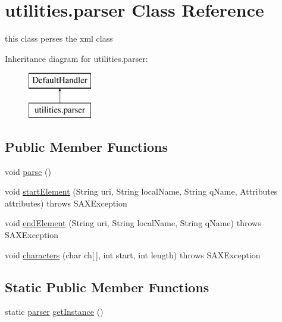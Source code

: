 \hypertarget{classutilities_1_1parser}{}\section{utilities.\+parser Class Reference}
\label{classutilities_1_1parser}


this class perses the xml class  


Inheritance diagram for utilities.\+parser\+:\begin{figure}[H]
\begin{center}
\leavevmode
\includegraphics[height=2.000000cm]{classutilities_1_1parser}
\end{center}
\end{figure}
\subsection*{Public Member Functions}
\begin{DoxyCompactItemize}
\item 
void \hyperlink{classutilities_1_1parser_ae11f73c41940e9ee2d05b95ab2fb9435}{parse} ()
\item 
void \hyperlink{classutilities_1_1parser_a89378ec321afe4275ae9a6f5833e5fb9}{start\+Element} (String uri, String local\+Name, String q\+Name, Attributes attributes)  throws S\+A\+X\+Exception 
\item 
void \hyperlink{classutilities_1_1parser_a63a7843809987e45e5bb9bb790a1c8ff}{end\+Element} (String uri, String local\+Name, String q\+Name)  throws S\+A\+X\+Exception 
\item 
void \hyperlink{classutilities_1_1parser_aaf564dc89d2e86903538e014323d1482}{characters} (char ch\mbox{[}$\,$\mbox{]}, int start, int length)  throws S\+A\+X\+Exception 
\end{DoxyCompactItemize}
\subsection*{Static Public Member Functions}
\begin{DoxyCompactItemize}
\item 
static \hyperlink{classutilities_1_1parser}{parser} \hyperlink{classutilities_1_1parser_aca9b03d52069091a9fbe48ca5723a52c}{get\+Instance} ()
\end{DoxyCompactItemize}


